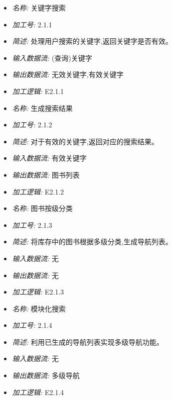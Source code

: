 \documentclass{article}
\begin{document}
\begin{CJK*}{UTF8}{gbsn}
\begin{itemize}
\end{itemize}


\vspace{-1mm}


\begin{itemize}
\item \textit{名称: } 关键字搜索
\item \textit{加工号: }2.1.1 
\item \textit{简述: }处理用户搜索的关键字,返回关键字是否有效。 
\item \textit{输入数据流: }(查询)关键字 
\item \textit{输出数据流: }无效关键字,有效关键字 
\item \textit{加工逻辑: }E2.1.1

\end{itemize}


\vspace{-1mm}


\begin{itemize}
\item \textit{名称: }生成搜索结果
\item \textit{加工号: }2.1.2 
\item \textit{简述: }对于有效的关键字,返回对应的搜索结果。 
\item \textit{输入数据流: }有效关键字
\item \textit{输出数据流: }图书列表
\item \textit{加工逻辑: }E2.1.2

\end{itemize}


\vspace{-1mm}


\begin{itemize}
\item \textit{名称: } 图书按级分类
\item \textit{加工号: }2.1.3 
\item \textit{简述: }将库存中的图书根据多级分类,生成导航列表。 
\item \textit{输入数据流: }无
\item \textit{输出数据流: }无
\item \textit{加工逻辑: }E2.1.3

\end{itemize}


\vspace{-1mm}


\begin{itemize}
\item \textit{名称: }模块化搜索
\item \textit{加工号: }2.1.4 
\item \textit{简述: }利用已生成的导航列表实现多级导航功能。 
\item \textit{输入数据流: }无
\item \textit{输出数据流: }多级导航 
\item \textit{加工逻辑: }E2.1.4


\end{itemize}
\end{CJK*}
\end{document}
